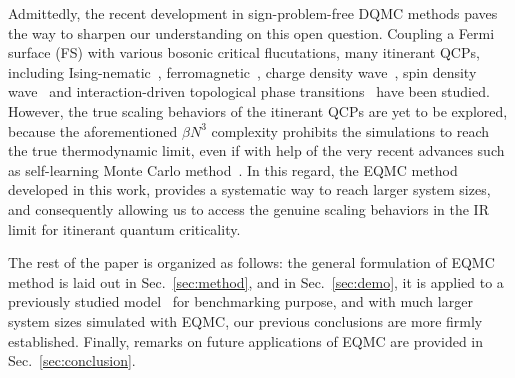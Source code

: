 \documentclass[aps,prx,twocolumn,superscriptaddress,showpacs,floatfix]{revtex4-1}
\begin{document}
Admittedly, the recent development in sign-problem-free DQMC methods paves the way to sharpen our understanding on this open question. Coupling a Fermi surface (FS) with various bosonic critical flucutations, many itinerant QCPs, including Ising-nematic~\cite{Schattner2015a,Lederer2016}, ferromagnetic~\cite{Xu2017}, charge density wave~\cite{ZXLi2015,ChuangChen2018a}, spin density wave~\cite{Berg12,ZXLi2016,Schattner2015b,Gerlach2017,ZHLiu2017,ZiHongLiu201808} and interaction-driven topological phase transitions~\cite{Xu2016a,Assaad2016,He2017} have been studied.
However, the true scaling behaviors of the itinerant QCPs are yet to be explored, because the aforementioned $\beta N^3$ complexity prohibits the simulations to reach the true thermodynamic limit, even if with help of the very recent advances such as self-learning Monte Carlo method~\cite{liu2016self,liu2016fermion,Xu2016self,Nagai2017,ChuangChen2018a}.
In this regard, the EQMC method developed in this work, provides a systematic way to reach larger system sizes, and consequently allowing us to access the genuine scaling behaviors in the IR limit for itinerant quantum criticality.

The rest of the paper is organized as follows: the general formulation of EQMC method is laid out in Sec.~\ref{sec:method}, and in Sec.~\ref{sec:demo}, it is applied to a previously studied model~\cite{ZHLiu2017} for benchmarking purpose, and with much larger system sizes simulated with EQMC, our previous conclusions are more firmly established. Finally, remarks on future applications of EQMC are provided in Sec.~\ref{sec:conclusion}.


\end{document}
